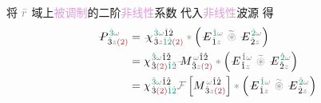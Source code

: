 将 $\mathcolor{gray}{\bar{r}}$ 域上\textcolor{Plum}{被调制}的二阶\textcolor{Plum}{非线性}系数  代入\textcolor{Plum}{非线性}\textcolor{NavyBlue}{波源}  得
\begin{subequations} \label{eq:DP^(2)-3_12-spectrum-C}
\begin{align}
	\Xint{\mathcolor{gray}{-}}{30}{P}^{\;\! \textcolor{PineGreen}{\hat{3}} \mathcolor{gray}{\omega} }_{\;\! \hat{3}\mathcolor{gray}{z} \textcolor{Maroon}{(2)} } &= \Xint{{}^{}_{\mathcolor{gray}{-}}}{23}{\chi}^{\;\! \textcolor{PineGreen}{\hat{3}} \mathcolor{gray}{\omega} \hat{1} \hat{2} }_{\;\! \hat{3} \mathcolor{gray}{z} \textcolor{PineGreen}{\hat{1} \hat{2}} \textcolor{Maroon}{(2)}} \mathcolor{gray}{*} \left( \Xint{\mathcolor{gray}{-}}{295}{E}^{\;\!\textcolor{PineGreen}{\hat{1}} \mathcolor{gray}{\omega}}_{\;\! \hat{1} \mathcolor{gray}{z}} ~\mathcolor{gray}{\widetilde \circledast}~ \Xint{\mathcolor{gray}{-}}{295}{E}^{\;\!\textcolor{PineGreen}{\hat{2}} \mathcolor{gray}{\omega}}_{\;\! \hat{2} \mathcolor{gray}{z}} \right) \label{eq:DP^(2)-3_12-spectrum-C1} \\
	&= {\chi}^{\;\! \textcolor{PineGreen}{\hat{3}} \mathcolor{gray}{\omega} \hat{1} \hat{2} }_{\;\! \hat{3} \textcolor{Maroon}{(2)} \textcolor{PineGreen}{\hat{1} \hat{2}}} \Xint{\mathcolor{gray}{-}}{18}{M}^{\;\! \mathcolor{gray}{\omega} \hat{1} \hat{2} }_{\;\! \hat{3} \mathcolor{gray}{z} \textcolor{Maroon}{(2)} } \mathcolor{gray}{*} \left( \Xint{\mathcolor{gray}{-}}{295}{E}^{\;\!\textcolor{PineGreen}{\hat{1}} \mathcolor{gray}{\omega}}_{\;\! \hat{1} \mathcolor{gray}{z}} ~\mathcolor{gray}{\widetilde \circledast}~ \Xint{\mathcolor{gray}{-}}{295}{E}^{\;\!\textcolor{PineGreen}{\hat{2}} \mathcolor{gray}{\omega}}_{\;\! \hat{2} \mathcolor{gray}{z}} \right) \label{eq:DP^(2)-3_12-spectrum-C2} \\
	&= {\chi}^{\;\! \textcolor{PineGreen}{\hat{3}} \mathcolor{gray}{\omega} \hat{1} \hat{2} }_{\;\! \hat{3} \textcolor{Maroon}{(2)} \textcolor{PineGreen}{\hat{1} \hat{2}}} \mathcolor{gray}{\mathcal F} \left[ M^{\;\! \mathcolor{gray}{\omega} \hat{1} \hat{2} }_{\;\! \hat{3} \mathcolor{gray}{z} \textcolor{Maroon}{(2)} } \right] \mathcolor{gray}{*} \left( \Xint{\mathcolor{gray}{-}}{295}{E}^{\;\!\textcolor{PineGreen}{\hat{1}} \mathcolor{gray}{\omega}}_{\;\! \hat{1} \mathcolor{gray}{z}} ~\mathcolor{gray}{\widetilde \circledast}~ \Xint{\mathcolor{gray}{-}}{295}{E}^{\;\!\textcolor{PineGreen}{\hat{2}} \mathcolor{gray}{\omega}}_{\;\! \hat{2} \mathcolor{gray}{z}} \right) \label{eq:DP^(2)-3_12-spectrum-C3} \\

\end{align}
\end{subequations}
